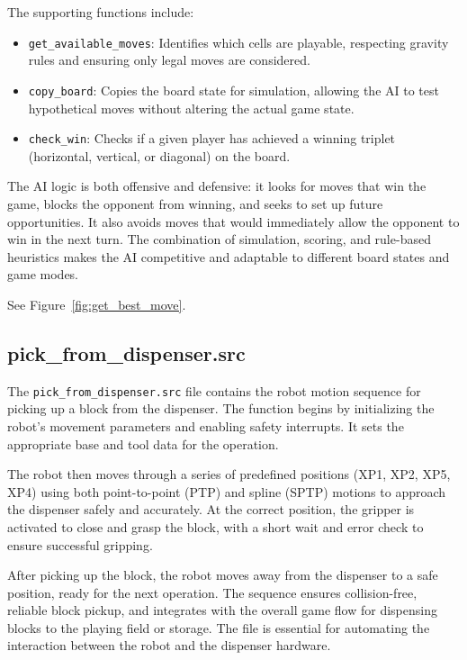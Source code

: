 \documentclass{article}
\begin{document}
            The supporting functions include:
            \begin{itemize}
                \item \texttt{get\_available\_moves}: Identifies which cells are playable, respecting gravity rules and ensuring only legal moves are considered.
                \item \texttt{copy\_board}: Copies the board state for simulation, allowing the AI to test hypothetical moves without altering the actual game state.
                \item \texttt{check\_win}: Checks if a given player has achieved a winning triplet (horizontal, vertical, or diagonal) on the board.
            \end{itemize}

            The AI logic is both offensive and defensive: it looks for moves that win the game, blocks the opponent from winning, and seeks to set up future opportunities. It also avoids moves that would immediately allow the opponent to win in the next turn. The combination of simulation, scoring, and rule-based heuristics makes the AI competitive and adaptable to different board states and game modes.

            See Figure~\ref{fig:get_best_move}.

        \subsection{pick\_from\_dispenser.src}
            The \texttt{pick\_from\_dispenser.src} file contains the robot motion sequence for picking up a block from the dispenser. The function begins by initializing the robot's movement parameters and enabling safety interrupts. It sets the appropriate base and tool data for the operation.

            The robot then moves through a series of predefined positions (XP1, XP2, XP5, XP4) using both point-to-point (PTP) and spline (SPTP) motions to approach the dispenser safely and accurately. At the correct position, the gripper is activated to close and grasp the block, with a short wait and error check to ensure successful gripping.

            After picking up the block, the robot moves away from the dispenser to a safe position, ready for the next operation. The sequence ensures collision-free, reliable block pickup, and integrates with the overall game flow for dispensing blocks to the playing field or storage. The file is essential for automating the interaction between the robot and the dispenser hardware.
\end{document}
